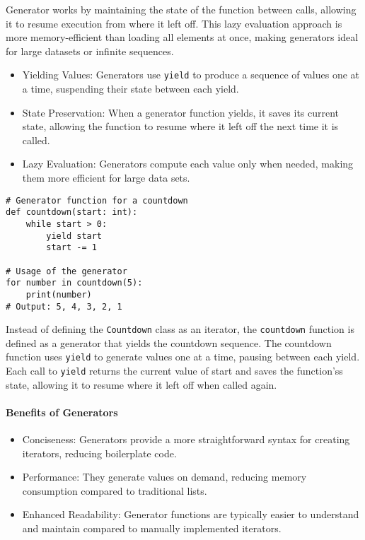 \documentclass[oneside,11pt,dvipsnames]{book}
\newcommand{\code}[1]{\texttt{#1}}
\begin{document}
Generator works by maintaining the state of the function between calls, allowing it to resume execution from where it left off. This lazy evaluation approach is more memory-efficient than loading all elements at once, making generators ideal for large datasets or infinite sequences.
\begin{itemize}
\item Yielding Values: Generators use \code{yield} to produce a sequence of values one at a time, suspending their state between each yield.
\item State Preservation: When a generator function yields, it saves its current state, allowing the function to resume where it left off the next time it is called.
\item Lazy Evaluation: Generators compute each value only when needed, making them more efficient for large data sets.
\end{itemize}


\begin{lstlisting}
# Generator function for a countdown
def countdown(start: int):
    while start > 0:
        yield start
        start -= 1

# Usage of the generator
for number in countdown(5):
    print(number)
# Output: 5, 4, 3, 2, 1
\end{lstlisting}

Instead of defining the \code{Countdown} class as an iterator, the \code{countdown} function is defined as a generator that yields the countdown sequence. The countdown function uses \code{yield} to generate values one at a time, pausing between each yield.
Each call to \code{yield} returns the current value of start and saves the function'ss state, allowing it to resume where it left off when called again.

\paragraph{Benefits of Generators}
\begin{itemize}
    \item Conciseness: Generators provide a more straightforward syntax for creating iterators, reducing boilerplate code.
	\item Performance: They generate values on demand, reducing memory consumption compared to traditional lists.
	\item Enhanced Readability: Generator functions are typically easier to understand and maintain compared to manually implemented iterators.    
\end{itemize}   
\end{document}

